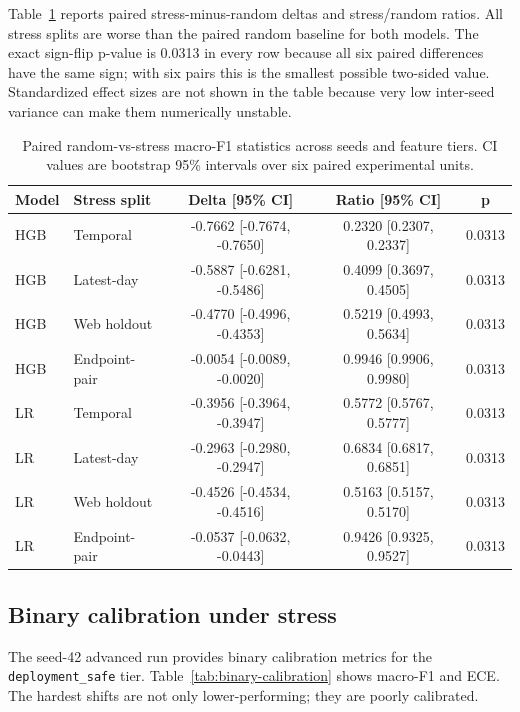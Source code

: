 \documentclass[11pt,a4paper]{article}
\begin{document}
Table~\ref{tab:paired-stats} reports paired stress-minus-random deltas and stress/random ratios. All stress splits are worse than the paired random baseline for both models. The exact sign-flip p-value is 0.0313 in every row because all six paired differences have the same sign; with six pairs this is the smallest possible two-sided value. Standardized effect sizes are not shown in the table because very low inter-seed variance can make them numerically unstable.

\begin{table}[ht]
\centering
\small
\caption{Paired random-vs-stress macro-F1 statistics across seeds and feature tiers. CI values are bootstrap 95\% intervals over six paired experimental units.}
\label{tab:paired-stats}
\begin{tabular}{llccc}
\toprule
Model & Stress split & Delta [95\% CI] & Ratio [95\% CI] & p \\
\midrule
HGB & Temporal & -0.7662 [-0.7674, -0.7650] & 0.2320 [0.2307, 0.2337] & 0.0313 \\
HGB & Latest-day & -0.5887 [-0.6281, -0.5486] & 0.4099 [0.3697, 0.4505] & 0.0313 \\
HGB & Web holdout & -0.4770 [-0.4996, -0.4353] & 0.5219 [0.4993, 0.5634] & 0.0313 \\
HGB & Endpoint-pair & -0.0054 [-0.0089, -0.0020] & 0.9946 [0.9906, 0.9980] & 0.0313 \\
LR & Temporal & -0.3956 [-0.3964, -0.3947] & 0.5772 [0.5767, 0.5777] & 0.0313 \\
LR & Latest-day & -0.2963 [-0.2980, -0.2947] & 0.6834 [0.6817, 0.6851] & 0.0313 \\
LR & Web holdout & -0.4526 [-0.4534, -0.4516] & 0.5163 [0.5157, 0.5170] & 0.0313 \\
LR & Endpoint-pair & -0.0537 [-0.0632, -0.0443] & 0.9426 [0.9325, 0.9527] & 0.0313 \\
\bottomrule
\end{tabular}
\end{table}

\subsection{Binary calibration under stress}

The seed-42 advanced run provides binary calibration metrics for the \texttt{deployment\_safe} tier. Table~\ref{tab:binary-calibration} shows macro-F1 and ECE. The hardest shifts are not only lower-performing; they are poorly calibrated.
\end{document}

